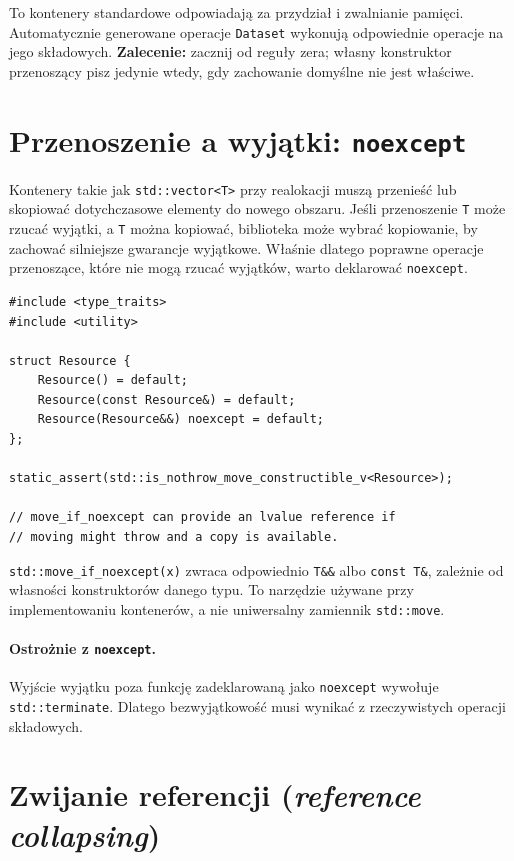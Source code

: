 To kontenery standardowe odpowiadają za przydział i zwalnianie
pamięci. Automatycznie generowane operacje \texttt{Dataset}
wykonują odpowiednie operacje na jego składowych. \textbf{Zalecenie:}
zacznij od reguły zera; własny konstruktor przenoszący pisz
jedynie wtedy, gdy zachowanie domyślne nie jest właściwe.

\section{Przenoszenie a wyjątki: \texttt{noexcept}}
\label{sec:move-noexcept}

Kontenery takie jak \texttt{std::vector<T>} przy realokacji muszą
przenieść lub skopiować dotychczasowe elementy do nowego obszaru.
Jeśli przenoszenie \texttt{T} może rzucać wyjątki, a \texttt{T}
można kopiować, biblioteka może wybrać kopiowanie, by zachować
silniejsze gwarancje wyjątkowe. Właśnie dlatego poprawne operacje
przenoszące, które nie mogą rzucać wyjątków, warto deklarować
\texttt{noexcept}.

\begin{lstlisting}
#include <type_traits>
#include <utility>

struct Resource {
    Resource() = default;
    Resource(const Resource&) = default;
    Resource(Resource&&) noexcept = default;
};

static_assert(std::is_nothrow_move_constructible_v<Resource>);

// move_if_noexcept can provide an lvalue reference if
// moving might throw and a copy is available.
\end{lstlisting}

\texttt{std::move\_if\_noexcept(x)} zwraca odpowiednio
\texttt{T\&\&} albo \texttt{const T\&}, zależnie od własności
konstruktorów danego typu. To narzędzie używane przy implementowaniu
kontenerów, a nie uniwersalny zamiennik \texttt{std::move}.

\paragraph{Ostrożnie z \texttt{noexcept}.}
Wyjście wyjątku poza funkcję zadeklarowaną jako
\texttt{noexcept} wywołuje \texttt{std::terminate}.
Dlatego bezwyjątkowość musi wynikać z rzeczywistych operacji składowych.

\section{Zwijanie referencji (\textit{reference collapsing})}
\label{sec:move-ref-collapse}

